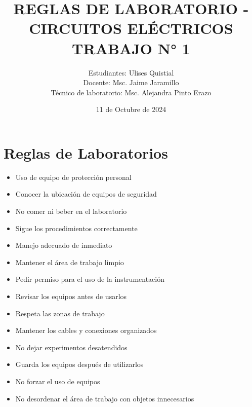 \documentclass[10pt,a4paper]{article}
\begin{document}
\author{Estudiantes: Ulises Quistial \\ Docente: Msc. Jaime Jaramillo  \\ Técnico de laboratorio: Msc. Alejandra Pinto Erazo}
\title{REGLAS DE LABORATORIO - CIRCUITOS ELÉCTRICOS 
TRABAJO N° 1 }
\date{11 de Octubre de 2024}
\maketitle
\section*{Reglas de Laboratorios}
\begin{itemize}
    \item Uso de equipo de protección personal
    \item Conocer la ubicación de equipos de seguridad
    \item No comer ni beber en el laboratorio
    \item Sigue los procedimientos correctamente
    \item Manejo adecuado de inmediato
    \item Mantener el área de trabajo limpio
    \item Pedir permiso para el uso de la instrumentación
    \item Revisar los equipos antes de usarlos
    \item Respeta las zonas de trabajo
    \item Mantener los cables y conexiones organizados
    \item No dejar experimentos desatendidos
    \item Guarda los equipos después de utilizarlos
    \item No forzar el uso de equipos
    \item No desordenar el área de trabajo con objetos innecesarios
\end{itemize}
\end{document}
